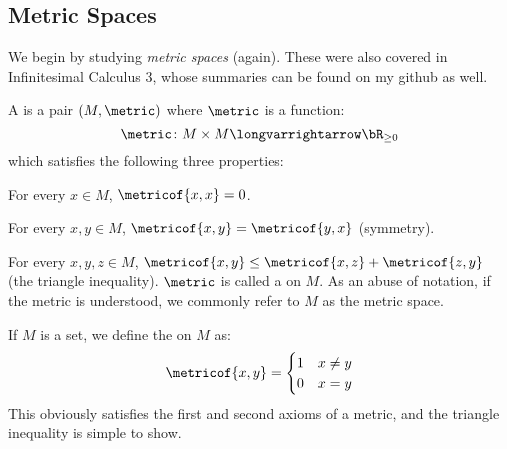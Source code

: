 \documentclass[10pt]{article}
\begin{document}


\bigskip

\subsection{Metric Spaces}

We begin by studying \emph{metric spaces} (again).
These were also covered in Infinitesimal Calculus $3$, whose summaries can be found on my github as well.

\begin{defn*}

    A  is a pair $(M, \metric)$ where $\metric$ is a function:
    \[ \metric\colon M\times M\longvarrightarrow\bR_{\geq0} \]
    which satisfies the following three properties:
    \benum
        \item For every $x\in M$, $\metricof{x,x}=0$.
        \item For every $x,y\in M$, $\metricof{x,y}=\metricof{y,x}$ (symmetry).
        \item For every $x,y,z\in M$, $\metricof{x,y}\leq\metricof{x,z}+\metricof{z,y}$ (the triangle inequality).
    \eenum
    $\metric$ is called a  on $M$.
    As an abuse of notation, if the metric is understood, we commonly refer to $M$ as the metric space.

\end{defn*}

\begin{exam*}

    If $M$ is a set, we define the  on $M$ as:
    \[ \metricof{x,y} = \begin{cases} 1 & x\neq y \\ 0 & x=y \end{cases} \]
    This obviously satisfies the first and second axioms of a metric, and the triangle inequality is simple to show.

\end{exam*}
\end{document}
